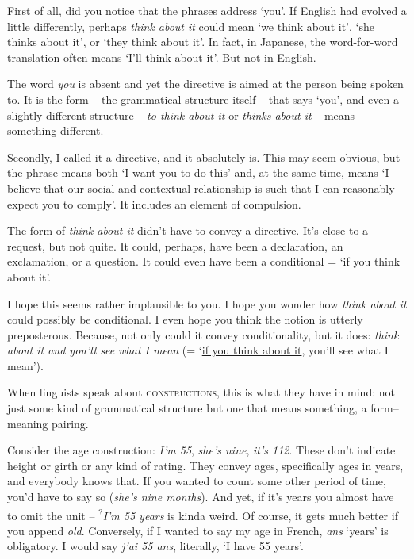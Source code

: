 First of all, did you notice that the phrases address `you'. If English had evolved a little differently, perhaps \textit{think about it} could mean `we think about it', `she thinks about it', or `they think about it'. In fact, in Japanese, the word-for-word translation often means `I'll think about it'. But not in English.

The word \textit{you} is absent and yet the directive is aimed at the person being spoken to. It is the form -- the grammatical structure itself -- that says `you', and even a slightly different structure -- \textit{to think about it} or \textit{thinks about it} -- means something different.

Secondly, I called it a directive, and it absolutely is. This may seem obvious, but the phrase means both `I want you to do this' and, at the same time, means `I believe that our social and contextual relationship is such that I can reasonably expect you to comply'. It includes an element of compulsion.

The form of \textit{think about it} didn't have to convey a directive. It's close to a request, but not quite. It could, perhaps, have been a declaration, an exclamation, or a question. It could even have been a conditional = `if you think about it'.

I hope this seems rather implausible to you. I hope you wonder how \textit{think about it} could possibly be conditional. I even hope you think the notion is utterly preposterous. Because, not only could it convey conditionality, but it does: \textit{think about it and you'll see what I mean} (= `\uline{if you think about it}, you'll see what I mean').

When linguists speak about \textsc{constructions}, this is what they have in mind: not just some kind of grammatical structure but one that means something, a form--meaning pairing.

\bigskip

Consider the age construction: \textit{I'm 55}, \textit{she's nine}, \textit{it's 112}. These don't indicate height or girth or any kind of rating. They convey ages, specifically ages in years, and everybody knows that. If you wanted to count some other period of time, you'd have to say so (\textit{she's nine months}). And yet, if it's years you almost have to omit the unit -- \textsuperscript{?}\textit{I'm 55 years} is kinda weird. Of course, it gets much better if you append \textit{old}. Conversely, if I wanted to say my age in French, \textit{ans} `years' is obligatory. I would say \textit{j'ai 55 ans}, literally, `I have 55 years'. 

